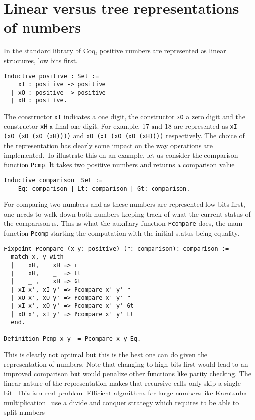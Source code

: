 \section{Linear versus tree representations of numbers\label{ZTree}}

In the standard library of {\sc Coq}, positive numbers are represented as linear structures, low bits first.

\begin{verbatim}
Inductive positive : Set :=
    xI : positive -> positive 
  | xO : positive -> positive 
  | xH : positive.
\end{verbatim}
The constructor {\tt xI} indicates a one digit, the constructor {\tt xO}
a zero digit and the constructor {\tt xH} a final one digit.
For example, 17 and 18 are represented as {\tt xI (xO (xO (xO (xH))))} and
{\tt xO (xI (xO (xO (xH))))} respectively. The choice of the representation
has clearly some impact on the way operations are implemented. To illustrate this on an example,
let us consider the comparison function {\tt Pcmp}. It takes two positive numbers
and returns a comparison value
\begin{verbatim}
Inductive comparison: Set :=
    Eq: comparison | Lt: comparison | Gt: comparison.
\end{verbatim}
For comparing two numbers and as these numbers are represented low bits first,
one needs to walk down both numbers keeping track of what the current status
of the comparison is. This is what the auxillary function {\tt Pcompare} does, the main 
function {\tt Pcomp} starting the computation with the initial status being equality.
\begin{verbatim}
Fixpoint Pcompare (x y: positive) (r: comparison): comparison :=
  match x, y with
  |    xH,    xH => r
  |    xH,    _  => Lt
  |    _ ,    xH => Gt
  | xI x', xI y' => Pcompare x' y' r
  | xO x', xO y' => Pcompare x' y' r
  | xI x', xO y' => Pcompare x' y' Gt
  | xO x', xI y' => Pcompare x' y' Lt
  end.
  
Definition Pcmp x y := Pcompare x y Eq.
\end{verbatim}
This is clearly not optimal but this is the best one can do given the representation
of numbers. Note that changing to high bits first would lead to an improved
comparison but would penalize other functions like parity checking. The linear
nature of the representation makes that recursive calls only skip a single
bit. This is a real problem. Efficient algorithms for large numbers like Karatsuba 
multiplication~\cite{Karat} use a divide and conquer strategy which requires to be able to split numbers
